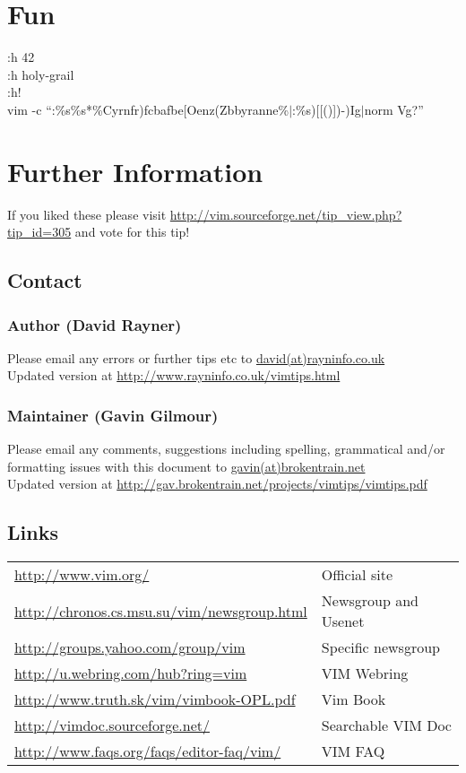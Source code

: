 \documentclass[10pt]{article}
\begin{document}
\section*{Fun}
 :h 42\\
 :h holy-grail\\
 :h!\\
 vim -c ``:\%s\%s*\%Cyrnfr)fcbafbe[Oenz(Zbbyranne\%$|$:\%s)[[()])-)Ig$|$norm Vg?''

\section*{Further Information}
If you liked these please visit \url{http://vim.sourceforge.net/tip_view.php?tip_id=305} and vote for this tip!

\subsection*{Contact}

\subsubsection*{Author (David Rayner)}
Please email any errors or further tips etc to \url{david(at)rayninfo.co.uk}\\
Updated version at \url{http://www.rayninfo.co.uk/vimtips.html}

\subsubsection*{Maintainer (Gavin Gilmour)}
Please email any comments, suggestions including spelling, grammatical and/or formatting issues with this document to \url{gavin(at)brokentrain.net}\\
Updated version at \url{http://gav.brokentrain.net/projects/vimtips/vimtips.pdf}

\subsection*{Links}
\begin{longtable}{l|l}
    \url{http://www.vim.org/} & Official site\\
    \url{http://chronos.cs.msu.su/vim/newsgroup.html} & Newsgroup and Usenet\\
    \url{http://groups.yahoo.com/group/vim} & Specific newsgroup\\
    \url{http://u.webring.com/hub?ring=vim} & VIM Webring\\
    \url{http://www.truth.sk/vim/vimbook-OPL.pdf} & Vim Book\\
    \url{http://vimdoc.sourceforge.net/} & Searchable VIM Doc\\
    \url{http://www.faqs.org/faqs/editor-faq/vim/} & VIM FAQ\\
\end{longtable}
\end{document}
